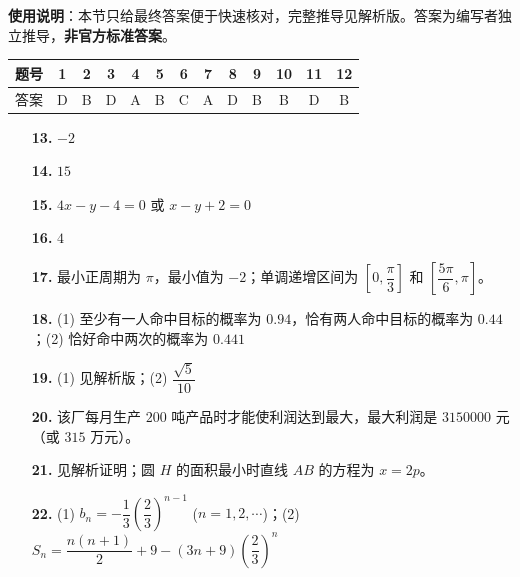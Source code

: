 
\begin{gknotice}
\textbf{使用说明}：本节只给最终答案便于快速核对，完整推导见解析版。答案为编写者独立推导，\textbf{非官方标准答案}。
\end{gknotice}

\begin{center}\begin{tabular}{ccccccccccccc}
\toprule
题号 & 1 & 2 & 3 & 4 & 5 & 6 & 7 & 8 & 9 & 10 & 11 & 12 \\
\midrule
答案 & D & B & D & A & B & C & A & D & B & B & D & B \\
\bottomrule
\end{tabular}\end{center}

\begin{itemize}[leftmargin=2.6em]
  \item[\textbf{13.}] $-2$
  \item[\textbf{14.}] $15$
  \item[\textbf{15.}] $4x - y - 4 = 0$ 或 $x - y + 2 = 0$
  \item[\textbf{16.}] $4$
\end{itemize}

\begin{itemize}[leftmargin=2.6em]
  \item[\textbf{17.}] 最小正周期为 $\pi$，最小值为 $-2$；单调递增区间为 $\left[0, \dfrac{\pi}{3}\right]$ 和 $\left[\dfrac{5\pi}{6}, \pi\right]$。
  \item[\textbf{18.}] (1) 至少有一人命中目标的概率为 $0.94$，恰有两人命中目标的概率为 $0.44$；(2) 恰好命中两次的概率为 $0.441$
  \item[\textbf{19.}] (1) 见解析版；(2) $\dfrac{\sqrt{5}}{10}$
  \item[\textbf{20.}] 该厂每月生产 $200$ 吨产品时才能使利润达到最大，最大利润是 $3150000$ 元（或 $315$ 万元）。
  \item[\textbf{21.}] 见解析证明；圆 $H$ 的面积最小时直线 $AB$ 的方程为 $x = 2p$。
  \item[\textbf{22.}] (1) $b_n = -\dfrac{1}{3}\left(\dfrac{2}{3}\right)^{n-1}$ ($n = 1, 2, \cdots$)；(2) $S_n = \dfrac{n(n+1)}{2} + 9 - (3n + 9)\left(\dfrac{2}{3}\right)^n$
\end{itemize}

